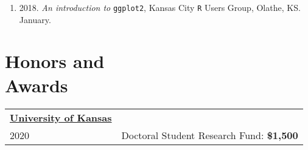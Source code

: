 \documentclass[margin,line,pifont,palatino,courier]{res}
\begin{document}
\begin{resume}
\begin{enumerate}
\item 2018. \emph{An introduction to} \verb+ggplot2+, Kansas City \verb+R+ Users Group,
Olathe, KS. January.
\end{enumerate}


\section{\sc Honors and\\ Awards}

\begin{tabular}{ll}
  \textbf{\underline{University of Kansas}} &\\
  2020       & Doctoral Student Research Fund: \bf{\$1,500}\\

\end{tabular}
\end{resume}
\end{document}
